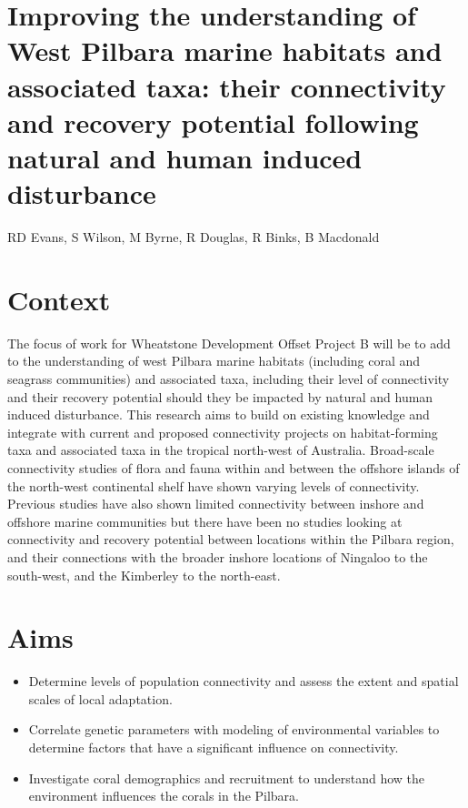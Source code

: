 \documentclass[version=last,
    paper=a4, %
    10pt, %
    usenames,
    dvipsnames,
    oneside, %
    headings=openany, %
    DIV=15 %
]{scrbook}
\begin{document}
\section*{Improving the understanding of West Pilbara marine habitats and
associated taxa: their connectivity and recovery potential following
natural and human induced disturbance
}

RD Evans, S Wilson, M Byrne, R Douglas, R Binks, B Macdonald


\section*{Context}
The focus of work for Wheatstone Development Offset Project B will be to
add to the understanding of west Pilbara marine habitats (including
coral and seagrass communities) and associated taxa, including their
level of connectivity and their recovery potential should they be
impacted by natural and human induced disturbance. This research aims to
build on existing knowledge and integrate with current and proposed
connectivity projects on habitat-forming taxa and associated taxa in the
tropical north-west of Australia. Broad-scale connectivity studies of
flora and fauna within and between the offshore islands of the
north-west continental shelf have shown varying levels of connectivity.
Previous studies have also shown limited connectivity between inshore
and offshore marine communities but there have been no studies looking
at connectivity and recovery potential between locations within the
Pilbara region, and their connections with the broader inshore locations
of Ningaloo to the south-west, and the Kimberley to the north-east.



\section*{Aims}
\begin{itemize}
\itemsep1pt\parskip0pt
\item
  Determine levels of population connectivity and assess the extent and
  spatial scales of local adaptation.
\item
  Correlate genetic parameters with modeling of environmental variables
  to determine factors that have a significant influence on
  connectivity.
\item
  Investigate coral demographics and recruitment to understand how the
  environment influences the corals in the Pilbara.
\end{itemize}
\end{document}
